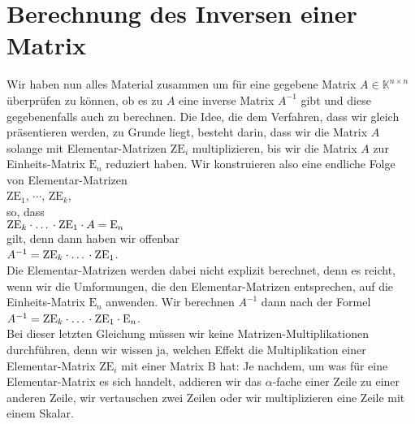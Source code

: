 \section{Berechnung des Inversen einer Matrix}
Wir haben nun alles Material zusammen um f\"{u}r eine gegebene Matrix $A \in \mathbb{K}^{n \times n}$
\"{u}berpr\"{u}fen zu k\"{o}nnen, ob es zu $A$ eine inverse Matrix $A^{-1}$ gibt und diese gegebenenfalls auch
zu berechnen.  Die Idee, die dem Verfahren, dass wir gleich pr\"{a}sentieren werden, zu Grunde liegt,
besteht darin, dass wir die Matrix $A$ solange mit Elementar-Matrizen $\mathrm{ZE}_i$
multiplizieren, bis wir die Matrix $A$ zur Einheits-Matrix $\mathrm{E}_n$ reduziert haben.  
Wir konstruieren also eine endliche Folge von Elementar-Matrizen 
\\[0.2cm]
\hspace*{1.3cm}
$\mathrm{ZE}_1$, $\cdots$, $\mathrm{ZE}_k$,
\\[0.2cm]
so, dass 
\\[0.2cm]
\hspace*{1.3cm}
$\mathrm{ZE}_k \cdot \mbox{\dots} \cdot \mathrm{ZE}_1 \cdot A = \mathrm{E}_n$
\\[0.2cm]
gilt, denn dann haben wir offenbar
\\[0.2cm]
\hspace*{1.3cm}
$A^{-1} = \mathrm{ZE}_k \cdot \mbox{\dots} \cdot \mathrm{ZE}_1$.
\\[0.2cm]
Die Elementar-Matrizen werden dabei nicht explizit berechnet, denn es reicht, wenn wir die
Umformungen, die den Elementar-Matrizen entsprechen, auf die Einheits-Matrix $\mathrm{E}_n$
anwenden.  Wir berechnen $A^{-1}$ dann nach der Formel
\\[0.2cm]
\hspace*{1.3cm}
$A^{-1} = \mathrm{ZE}_k \cdot \mbox{\dots} \cdot \mathrm{ZE}_1 \cdot \mathrm{E}_n$.
\\[0.2cm]
Bei dieser letzten Gleichung m\"{u}ssen wir keine Matrizen-Multiplikationen durchf\"{u}hren, denn wir wissen
ja, welchen Effekt die Multiplikation einer Elementar-Matrix $\mathrm{ZE}_i$ mit einer Matrix
$\mathrm{B}$ hat:  Je nachdem, um was f\"{u}r eine Elementar-Matrix es sich handelt, addieren wir das
$\alpha$-fache einer Zeile zu einer anderen Zeile, wir vertauschen zwei Zeilen oder wir
multiplizieren eine Zeile mit einem Skalar. 

